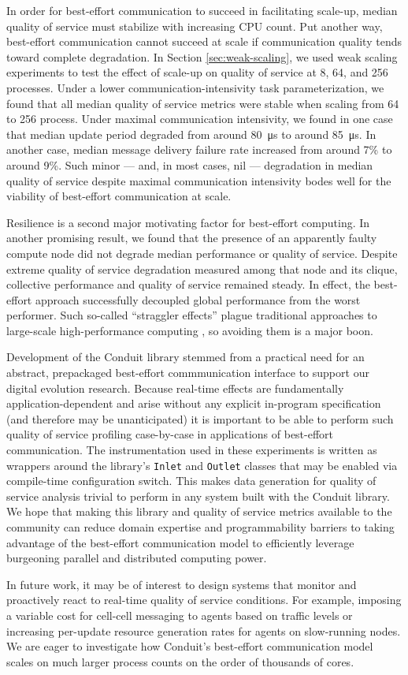 In order for best-effort communication to succeed in facilitating scale-up, median quality of service must stabilize with increasing CPU count.
Put another way, best-effort communication cannot succeed at scale if communication quality tends toward complete degradation.
In Section \ref{sec:weak-scaling}, we used weak scaling experiments to test the effect of scale-up on quality of service at 8, 64, and 256 processes.
Under a lower communication-intensivity task parameterization, we found that all median quality of service metrics were stable when scaling from 64 to 256 process.
Under maximal communication intensivity, we found in one case that median update period degraded from around \SI{80}{\micro\second} to around \SI{85}{\micro\second}.
In another case, median message delivery failure rate increased from around 7\% to around 9\%.
Such minor --- and, in most cases, nil --- degradation in median quality of service despite maximal communication intensivity bodes well for the viability of best-effort communication at scale.

Resilience is a second major motivating factor for best-effort computing.
In another promising result, we found that the presence of an apparently faulty compute node did not degrade median performance or quality of service.
Despite extreme quality of service degradation measured among that node and its clique, collective performance and quality of service remained steady.
In effect, the best-effort approach successfully decoupled global performance from the worst performer.
Such so-called ``straggler effects'' plague traditional approaches to large-scale high-performance computing \citep{aktacs2019straggler}, so avoiding them is a major boon.

Development of the Conduit library stemmed from a practical need for an abstract, prepackaged best-effort commmunication interface to support our digital evolution research.
Because real-time effects are fundamentally application-dependent and arise without any explicit in-program specification (and therefore may be unanticipated) it is important to be able to perform such quality of service profiling case-by-case in applications of best-effort communication.
The instrumentation used in these experiments is written as wrappers around the library's \texttt{Inlet} and \texttt{Outlet} classes that may be enabled via compile-time configuration switch.
This makes data generation for quality of service analysis trivial to perform in any system built with the Conduit library.
We hope that making this library and quality of service metrics available to the community can reduce domain expertise and programmability barriers to taking advantage of the best-effort communication model to efficiently leverage burgeoning parallel and distributed computing power.

In future work, it may be of interest to design systems that monitor and proactively react to real-time quality of service conditions.
For example, imposing a variable cost for cell-cell messaging to agents based on traffic levels or increasing per-update resource generation rates for agents on slow-running nodes.
We are eager to investigate how Conduit's best-effort communication model scales on much larger process counts on the order of thousands of cores.
